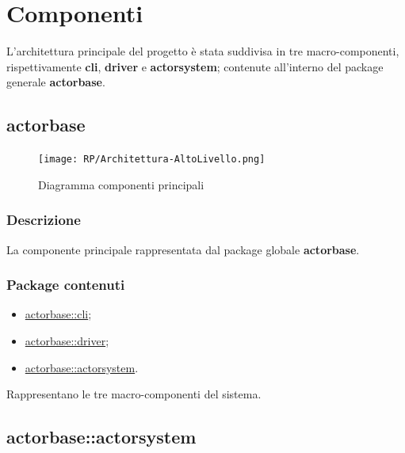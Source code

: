 \documentclass{scalatekids-article}
\begin{document}
\section{Componenti}

L'architettura principale del progetto è stata suddivisa in tre macro-componenti, rispettivamente
\textbf{cli}, \textbf{driver} e \textbf{actorsystem}; contenute all'interno del package
generale \textbf{actorbase}.

\subsection{actorbase}
\label{sec:actorbase}

\begin{figure}[H]
  \begin{center}
    \texttt{[image: RP/Architettura-AltoLivello.png]}
    \caption{Diagramma componenti principali}
  \end{center}
\end{figure}

\subsubsection{Descrizione}

La componente principale rappresentata dal package globale \textbf{actorbase}.

\subsubsection{Package contenuti}

\begin{itemize}
\item \hyperref[sec:actorbase::cli]{actorbase::cli};
\item \hyperref[sec:actorbase::driver]{actorbase::driver};
\item \hyperref[sec:actorbase::actorsystem]{actorbase::actorsystem}.
\end{itemize}

Rappresentano le tre macro-componenti del sistema.


\subsection{actorbase::actorsystem}
\label{sec:actorbase::actorsystem}
\end{document}

